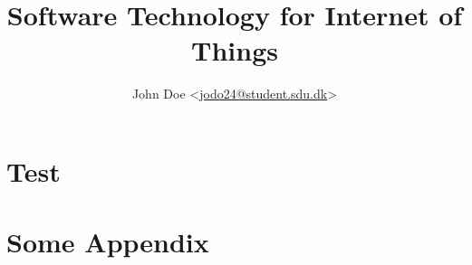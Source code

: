 \documentclass[
  article,
  10pt,
  a4paper,
  oneside,
  openany,
  twocolumn
]{memoir}
\title{Software Technology for Internet of Things\\ \scalebox{0.85}{Portfolio \#2: Temperature Publication}}
\author{John Doe <\href{mailto:jodo24@mmmi.sdu.dk}{jodo24@student.sdu.dk}>}
\begin{document}
\maketitle

\chapter{Test}
\lipsum[1-4]

\newpage
\appendix
\onecolumn

\chapter{Some Appendix}
\lipsum[1-4]
\end{document}
